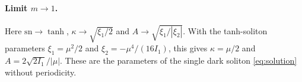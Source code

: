 \documentclass{article}
\begin{document}
\paragraph{Limit $m\to 1$.} Here $\mathrm{sn}\to\tanh$, $\kappa\to\sqrt{\xi_1/2}$ and $A\to\sqrt{\xi_1/|\xi_2|}$. With the tanh-soliton parameters $\xi_1=\mu^2/2$ and $\xi_2=-\mu^4/(16I_1)$, this gives $\kappa=\mu/2$ and $A=2\sqrt{2I_1}/|\mu|$. These are the parameters of the single dark soliton \eqref{eq:solution} without periodicity.
\end{document}
